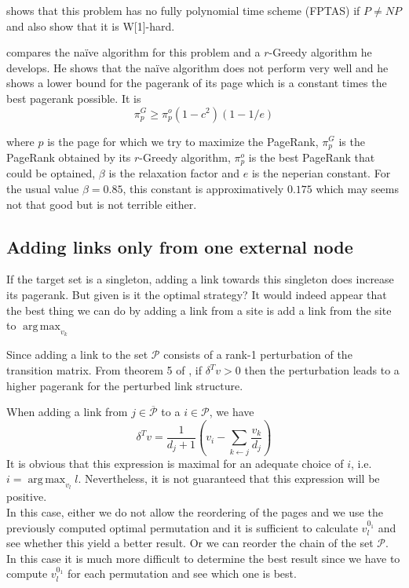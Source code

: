 \documentclass{article}
\DeclareMathOperator*{\argmax}{arg\,max}
\newcommand{\1}{\mathbf{1}}
\theoremstyle{definition}
\begin{document}
\cite{olsen2010maximizing} shows that this problem has no fully polynomial time scheme (FPTAS) if \(P \neq NP\) and also show that it is W[1]-hard.

\cite{olsen2010constant} compares the naïve algorithm for this problem and a \(r\)-Greedy algorithm he develops.
He shows that the naïve algorithm does not perform very well and he shows a lower bound for the pagerank of its page which is a constant times the best pagerank possible. It is
\[ \pi_p^G \geq \pi_p^o(1 - c^2)(1 - 1/e) \]

where $p$ is the page for which we try to maximize the PageRank,
$\pi_p^G$ is the PageRank obtained by its $r$-Greedy algorithm, $\pi_p^o$ is the best PageRank that could be optained, $\beta$ is the relaxation factor and $e$ is the neperian constant.
For the usual value $\beta = 0.85$, this constant is approximatively $0.175$ which may seems not that good but is not terrible either.

\subsection{Adding links only from one external node}
If the target set is a singleton, adding a link towards this singleton does increase its pagerank. But given is it the optimal strategy? It would indeed appear that the best thing we can do by adding a link from a site is add a link from the site to $\argmax_{v_k}$

Since adding a link to the set $\mathcal{P}$ consists of a rank-1 perturbation of the transition matrix. From theorem 5 of \cite{de2008maximizing}, if $\delta^Tv>0$ then the perturbation leads to a higher pagerank for the perturbed link structure.

When adding a link from $j \in \overline{\mathcal{P}}$ to a $i \in \mathcal{P}$, we have
$$ \delta^Tv = \frac{1}{d_{j}+1}\left(v_i-\sum_{k\leftarrow j}\frac{v_k}{d_j}\right)$$
It is obvious that this expression is maximal for an adequate choice of $i$, i.e. $i = \argmax_{v_l} l$. Nevertheless, it is not guaranteed that this expression will be positive.\\
In this case, either we do not allow the reordering of the pages and we use the previously computed optimal permutation and it is sufficient to calculate $v^{0_1}_{l}$ and see whether this yield a better result. Or we can reorder the chain of the set $\mathcal{P}$. In this case it is much more difficult to determine the best result since we have to compute $v^{0_1}_{l}$ for each permutation and see which one is best.
\end{document}
